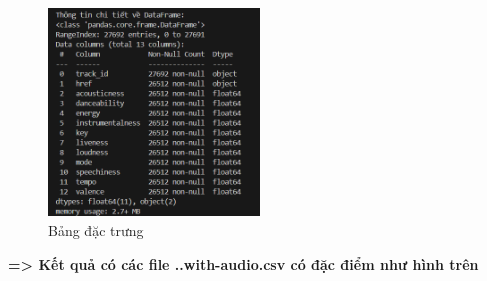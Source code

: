 \begin{figure}[h] %
    \centering %
    \includegraphics[width=0.5\textwidth]{../graphics/data_top50/figure/script/raw_audio/Screenshot 2025-09-30 230213.png} %
    \caption{Bảng đặc trưng} %
    \label{fig:example} %
\end{figure}

    \textbf{=> Kết quả có các file ..with-audio.csv có đặc điểm như hình trên}










      


